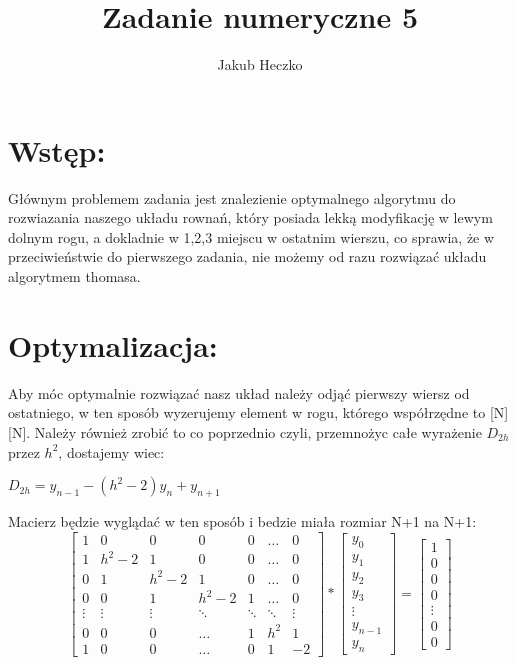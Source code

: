 \documentclass[12pt]{article}
\title{Zadanie numeryczne 5}
\author{Jakub Heczko}
\date{}
\begin{document}
\section{Wstęp:}
Głównym problemem zadania jest znalezienie optymalnego algorytmu do rozwiazania naszego układu rownań, który posiada lekką modyfikację w lewym dolnym rogu, a dokladnie w 1,2,3 miejscu w ostatnim wierszu, co sprawia, że w przeciwieństwie do pierwszego zadania, nie możemy od razu rozwiązać układu algorytmem thomasa.
\section{Optymalizacja:}
Aby móc optymalnie rozwiązać nasz układ należy odjąć pierwszy wiersz od ostatniego, w ten sposób wyzerujemy element w rogu, którego współrzędne to [N][N]. Należy również zrobić to co poprzednio czyli, przemnożyc całe wyrażenie $D_{2h}$ przez $h^{2}$, dostajemy wiec:
\newline
\begin{center}
    $D_{2h} = y_{n-1} - (h^{2} - 2)y_{n} + y_{n+1}$
\end{center}
Macierz będzie wyglądać w ten sposób i bedzie miała rozmiar N+1 na N+1:
\[
\begin{bmatrix}
    1 & 0 & 0 & 0 & 0 & \dots & 0\\
    1 & h^{2}-2 & 1 & 0 & 0 & \dots & 0\\ 
    0 & 1 & h^{2}-2 & 1 & 0 & \dots & 0\\
    0 & 0 & 1 & h^{2}-2 & 1 &\dots & 0\\
    \vdots & \vdots & \vdots & \ddots & \ddots & \ddots & \vdots\\
    0 & 0 & 0 & \hdots & 1 & h^{2} & 1\\
    1 & 0 & 0 & \hdots & 0 & 1 & -2
\end{bmatrix}
*
\begin{bmatrix}
    y_{0}\\
    y_{1}\\
    y_{2}\\
    y_{3}\\
    \vdots\\
    y_{n-1}\\
    y_{n}
\end{bmatrix}
=
\begin{bmatrix}
    1\\
    0\\
    0\\
    0\\
    \vdots\\
    0\\
    0
\end{bmatrix}
\]
\end{document}
